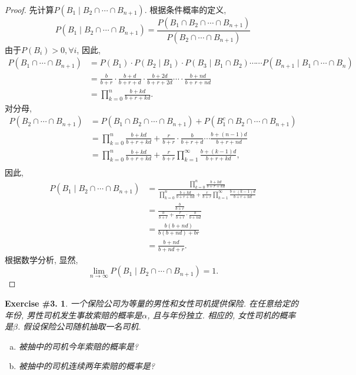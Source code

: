 \documentclass[UTF8, a4paper]{article}
\newtheorem{exercise}{Exercise \#3.}
\begin{document}
\begin{proof}
先计算\(P(B_1 \mid B_2 \cap \cdots \cap B_{n+1})\). 
根据条件概率的定义, 
$$
P\left(B_1 \mid B_2 \cap \cdots \cap B_{n+1}\right)=\frac{P\left(B_1 \cap B_2 \cap \cdots \cap B_{n+1}\right)}{P\left(B_2 \cap \cdots \cap B_{n+1}\right)}
$$
由于\(P(B_i) > 0, \forall i\), 因此, 
$$
\begin{aligned}
P\left(B_1 \cap \cdots \cap B_{n+1}\right) & =P\left(B_1\right) \cdot P\left(B_2 \mid B_1\right) \cdot P\left(B_3 \mid B_1 \cap B_2\right) \cdots \cdots P\left(B_{n+1} \mid B_1 \cap \cdots \cap B_n\right) \\
& =\frac{b}{b+r} \cdot \frac{b+d}{b+r+d} \cdot \frac{b+2 d}{b+r+2 d} \cdots \cdot \frac{b+n d}{b+r+n d} \\
& =\prod_{k=0}^n \frac{b+k d}{b+r+k d} .
\end{aligned}
$$
对分母, 
$$
\begin{aligned}
    P\left(B_2 \cap \cdots \cap B_{n+1}\right) &= P\left(B_1 \cap B_2 \cap \cdots \cap B_{n+1}\right) + P\left(B_1^c \cap B_2 \cap \cdots \cap B_{n+1}\right) \\
    &= \prod_{k=0}^n \frac{b+k d}{b+r+k d} + \frac{r}{b+r} \cdot \frac{b}{b+r+d} \cdots \frac{b+(n-1)d}{b+r+nd} \\
    &= \prod_{k=0}^n \frac{b+k d}{b+r+k d} + \frac{r}{b+r} \prod_{k=1}^{\infty} \frac{b+(k-1)d}{b+r+kd}, \\
\end{aligned}
$$
因此, 
$$
\begin{aligned}
    P\left(B_1 \mid B_2 \cap \cdots \cap B_{n+1}\right) &= \frac{\prod_{k=0}^n \frac{b+k d}{b+r+k d}}{\prod_{k=0}^n \frac{b+k d}{b+r+k d} + \frac{r}{b+r} \prod_{k=1}^{\infty} \frac{b+(k-1)d}{b+r+kd}} \\
    &= \frac{\frac{b}{b+r}}{\frac{b}{b+r} + \frac{r}{b+r}\cdot \frac{b}{b+nd} } \\
    & = \frac{b(b+nd)}{b(b+nd) +br} \\ &= \frac{b+nd}{b+nd +r}.
\end{aligned}
$$
根据数学分析, 显然, 
$$
\lim_{n\to \infty} P\left(B_1 \mid B_2 \cap \cdots \cap B_{n+1}\right) = 1.
$$
\end{proof}



\begin{framed}
\begin{exercise}
    一个保险公司为等量的男性和女性司机提供保险. 在任意给定的年份, 男性司机发生事故索赔的概率是\(\alpha\), 且与年份独立. 相应的, 女性司机的概率是\(\beta\).
    假设保险公司随机抽取一名司机. 
    \begin{enumerate}[a)]
        \item 被抽中的司机今年索赔的概率是?
        \item 被抽中的司机连续两年索赔的概率是?
    \end{enumerate}
\end{exercise}
\end{framed}
\end{document}
